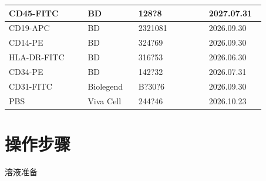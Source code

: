 \documentclass[UTF8,10pt,a4paper,fontset=fandol]{ctexart}
\newcommand{\fieldvalue}[1]{#1}
\newcommand{\handwritten}[1]{#1}
\begin{document}
\begin{tabular}{|p{0.28\linewidth}|p{0.18\linewidth}|p{0.25\linewidth}|p{0.20\linewidth}|}
\hline
CD45-FITC & BD &
\fieldvalue{\handwritten{128?8}} &
\fieldvalue{\handwritten{2027.07.31}}\\
\hline
CD19-APC & BD &
\fieldvalue{\handwritten{2321081}} &
\fieldvalue{\handwritten{2026.09.30}}\\
\hline
CD14-PE & BD &
\fieldvalue{\handwritten{324?69}} &
\fieldvalue{\handwritten{2026.09.30}}\\
\hline
HLA-DR-FITC & BD &
\fieldvalue{\handwritten{316?53}} &
\fieldvalue{\handwritten{2026.06.30}}\\
\hline
CD34-PE & BD &
\fieldvalue{\handwritten{142?32}} &
\fieldvalue{\handwritten{2026.07.31}}\\
\hline
CD31-FITC & Biolegend &
\fieldvalue{\handwritten{B?30?6}} &
\fieldvalue{\handwritten{2026.09.30}}\\
\hline
PBS & Viva Cell &
\fieldvalue{\handwritten{244?46}} &
\fieldvalue{\handwritten{2026.10.23}}\\
\hline
\end{tabular}

\section{操作步骤}

\begin{center}
溶液准备
\end{center}
\end{document}
